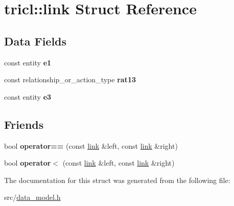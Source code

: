 \hypertarget{structtricl_1_1link}{}\section{tricl\+:\+:link Struct Reference}
\label{structtricl_1_1link}
\subsection*{Data Fields}
\begin{DoxyCompactItemize}
\item 
\mbox{\label{structtricl_1_1link_a94b71567d0a342c8d0bf28e4fea1dff4}} 
const entity {\bfseries e1}
\item 
\mbox{\label{structtricl_1_1link_a9a21745032378ca68f88966d78814be0}} 
const relationship\+\_\+or\+\_\+action\+\_\+type {\bfseries rat13}
\item 
\mbox{\label{structtricl_1_1link_ad54f7dbfcda5fd3f98ff5db897893c87}} 
const entity {\bfseries e3}
\end{DoxyCompactItemize}
\subsection*{Friends}
\begin{DoxyCompactItemize}
\item 
\mbox{\label{structtricl_1_1link_a383e61e15072ef3fe9e16102dea483e0}} 
bool {\bfseries operator==} (const \hyperlink{structtricl_1_1link}{link} \&left, const \hyperlink{structtricl_1_1link}{link} \&right)
\item 
\mbox{\label{structtricl_1_1link_af79bc13140c8180154526642748b0c33}} 
bool {\bfseries operator$<$} (const \hyperlink{structtricl_1_1link}{link} \&left, const \hyperlink{structtricl_1_1link}{link} \&right)
\end{DoxyCompactItemize}


The documentation for this struct was generated from the following file\+:\begin{DoxyCompactItemize}
\item 
src/\hyperlink{data__model_8h}{data\+\_\+model.\+h}\end{DoxyCompactItemize}

